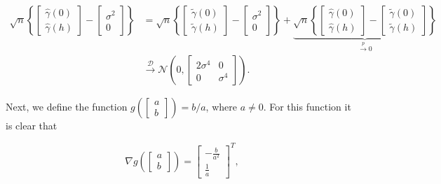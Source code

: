 \documentclass[]{book}
\theoremstyle{definition}
\theoremstyle{definition}
\theoremstyle{definition}
\theoremstyle{remark}
\begin{document}
\[
\begin{aligned}
    \sqrt{n}\left\{
        \begin{bmatrix}
         \hat{\gamma} \left( 0 \right) \\
         \hat{\gamma} \left( h \right)
        \end{bmatrix}
    - \begin{bmatrix}
         \sigma^2 \\
         0
        \end{bmatrix} \right\}
    &= \sqrt{n}\left\{
        \begin{bmatrix}
         \tilde{\gamma} \left( 0 \right) \\
         \tilde{\gamma} \left( h \right)
        \end{bmatrix}
    - \begin{bmatrix}
         \sigma^2 \\
         0
        \end{bmatrix} \right\}
    + \underbrace{\sqrt{n}\left\{
        \begin{bmatrix}
         \hat{\gamma} \left( 0 \right) \\
         \hat{\gamma} \left( h \right)
        \end{bmatrix}
    - \begin{bmatrix}
         \tilde{\gamma} \left( 0 \right) \\
         \tilde{\gamma} \left( h \right)
        \end{bmatrix} \right\}}_{\overset{p}{\to} 0}\\
    &\overset{\mathcal{D}}{\to} 
    \mathcal{N}\left(0, \begin{bmatrix}
         2\sigma^4 & 0\\
         0 & \sigma^4
        \end{bmatrix} \right).
    \end{aligned}
\]

Next, we define the function
\(g\left( \begin{bmatrix}  a \\  b  \end{bmatrix} \right) = b/a\), where
\(a \neq 0\). For this function it is clear that

\[
\nabla g\left( \begin{bmatrix}
         a \\
         b
        \end{bmatrix} \right) = \begin{bmatrix}
         -\frac{b}{a^2} \\
         \frac{1}{a}
        \end{bmatrix}^{T} ,
\]
\end{document}
